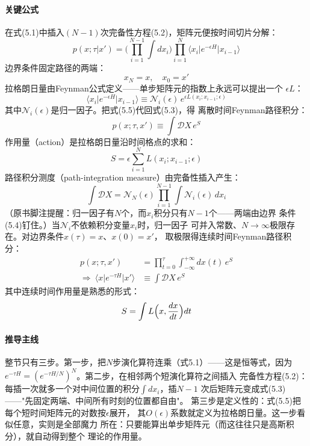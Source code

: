 \paragraph{关键公式}
在式(5.1)中插入$(N-1)$次完备性方程(5.2)，矩阵元便按时间切片分解：
\begin{equation*}
p(x;\tau\vert x')=\Biggl(\prod_{i=1}^{N-1}\int dx_{i}\Biggr)\prod_{i=1}^{N}
\langle x_{i}\vert e^{-\epsilon H}\vert x_{i-1}\rangle
\tag{5.3}
\end{equation*}
边界条件固定路径的两端：
\begin{equation*}
x_{N}=x,\quad x_{0}=x'
\tag{5.4}
\end{equation*}
拉格朗日量由Feynman公式定义——单步矩阵元的指数上永远可以提出一个
$\epsilon L$：
\begin{equation*}
\langle x_{i}\vert e^{-\epsilon H}\vert x_{i-1}\rangle\equiv
\mathcal{N}_{i}(\epsilon)\,e^{\epsilon L(x_{i};x_{i-1};\epsilon)}
\tag{5.5}
\end{equation*}
其中$\mathcal{N}_{i}(\epsilon)$是归一因子。把式(5.5)代回式(5.3)，得
离散时间Feynman路径积分：
\begin{equation*}
p(x;\tau,x')\equiv\int\mathcal{D}X\,e^{S}
\tag{5.6}
\end{equation*}
作用量（action）是拉格朗日量沿时间格点的求和：
\begin{equation*}
S=\epsilon\sum_{i=1}^{N}L(x_{i};x_{i-1};\epsilon)
\tag{5.7}
\end{equation*}
路径积分测度（path-integration measure）由完备性插入产生：
\begin{equation*}
\int\mathcal{D}X=\mathcal{N}_{N}(\epsilon)\prod_{i=1}^{N-1}\int
\mathcal{N}_{i}(\epsilon)\,dx_{i}
\end{equation*}
（原书脚注提醒：归一因子有$N$个，而$x_i$积分只有$N-1$个——两端由边界
条件(5.4)钉住。）当$\mathcal{N}_{i}$不依赖积分变量$x_{i}$时，归一因子
可并入常数、$N\to\infty$极限存在。对边界条件$x(\tau)=x$、$x(0)=x'$，
取极限得连续时间Feynman路径积分：
\begin{align*}
p(x;\tau,x')&=\prod_{t=0}^{\tau}\int_{-\infty}^{+\infty}dx(t)\,e^{S}\\
\Rightarrow\ \langle x\vert e^{-\tau H}\vert x'\rangle&\equiv\int\mathcal{D}X\,e^{S}
\tag{5.8}
\end{align*}
其中连续时间作用量是熟悉的形式：
\begin{equation*}
S=\int L\Bigl(x,\frac{dx}{dt}\Bigr)dt
\end{equation*}

\paragraph{推导主线}
整节只有三步。第一步，把$N$步演化算符连乘（式5.1）——这是恒等式，因为
$e^{-\tau H}=(e^{-\tau H/N})^{N}$。第二步，在相邻两个短演化算符之间插入
完备性方程(5.2)：每插一次就多一个对中间位置的积分$\int dx_i$，插$N-1$
次后矩阵元变成式(5.3)——"先固定两端、中间所有时刻的位置都自由"。
第三步是定义性的：式(5.5)把每个短时间矩阵元的对数按$\epsilon$展开，
其$O(\epsilon)$系数就定义为拉格朗日量。这一步看似任意，实则是全部魔力
所在：只要能算出单步矩阵元（而这往往只是高斯积分），就自动得到整个
理论的作用量。

